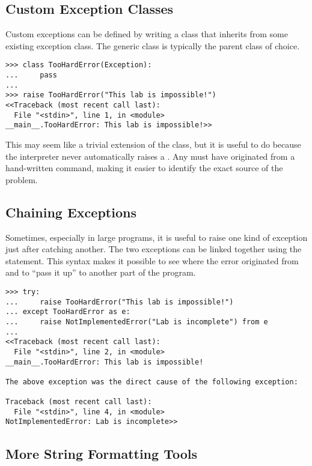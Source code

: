\subsection*{Custom Exception Classes} %

Custom exceptions can be defined by writing a class that inherits from some existing exception class.
The generic  class is typically the parent class of choice.

\begin{lstlisting}
>>> class TooHardError(Exception):
...     pass
...
>>> raise TooHardError("This lab is impossible!")
<<Traceback (most recent call last):
  File "<stdin>", line 1, in <module>
__main__.TooHardError: This lab is impossible!>>
\end{lstlisting}

This may seem like a trivial extension of the  class, but it is useful to do because the interpreter never automatically raises a .
Any  must have originated from a hand-written  command, making it easier to identify the exact source of the problem.

\subsection*{Chaining Exceptions} %

Sometimes, especially in large programs, it is useful to raise one kind of exception just after catching another.
The two exceptions can be linked together using the  statement.
This syntax makes it possible to see where the error originated from and to ``pass it up'' to another part of the program.

\begin{lstlisting}
>>> try:
...     raise TooHardError("This lab is impossible!")
... except TooHardError as e:
...     raise NotImplementedError("Lab is incomplete") from e
...
<<Traceback (most recent call last):
  File "<stdin>", line 2, in <module>
__main__.TooHardError: This lab is impossible!

The above exception was the direct cause of the following exception:

Traceback (most recent call last):
  File "<stdin>", line 4, in <module>
NotImplementedError: Lab is incomplete>>
\end{lstlisting}

\subsection*{More String Formatting Tools} %

